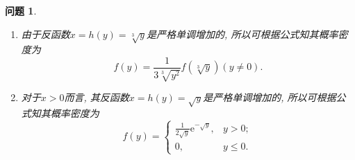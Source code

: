 \documentclass[a4paper]{article}
\newcommand{\e}{\mathrm{e}}
\newcommand{\disp}{\displaystyle}
\theoremstyle{mystyle}
\newtheorem{prob}{问题}[section]
\begin{document}
	\setcounter{prob}{35}
	\begin{prob}
		\begin{enumerate}[{(}1{)}]
			\item 
			由于反函数$x=h(y)=\sqrt[3]{y}$是严格单调增加的, 所以可根据公式知其概率密度为
			\[
				f(y)=\frac{1}{3\sqrt[3]{y^2}}f(\sqrt[3]{y})(y\neq 0).
			\] 
			\item
			对于$x>0$而言, 其反函数$x=h(y)=\sqrt{y}$是严格单调增加的, 所以可根据公式知其概率密度为
			\[
				f(y)=
				\begin{cases}
					\disp \frac{1}{2\sqrt{y}}\e^{-\sqrt{y}},&y>0;\\
					0, &y\leqslant 0.
				\end{cases}
			\]
		\end{enumerate}
	\end{prob}
\end{document}

